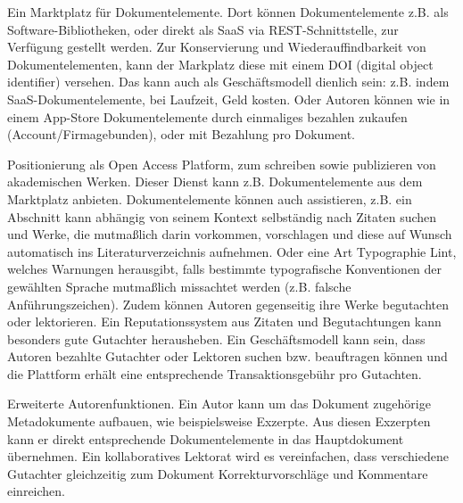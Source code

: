 Ein Marktplatz für Dokumentelemente. Dort können Dokumentelemente z.B. als Software-Bibliotheken, oder direkt als SaaS via REST-Schnittstelle, zur Verfügung gestellt werden. Zur Konservierung und Wiederauffindbarkeit von Dokumentelementen, kann der Markplatz diese mit einem DOI (digital object identifier) versehen. Das kann auch als Geschäftsmodell dienlich sein: z.B. indem SaaS-Dokumentelemente, bei Laufzeit, Geld kosten. Oder Autoren können wie in einem App-Store Dokumentelemente durch einmaliges bezahlen zukaufen (Account/Firmagebunden), oder mit Bezahlung pro Dokument.

 
Positionierung als Open Access Platform, zum schreiben sowie publizieren von akademischen Werken. Dieser Dienst kann z.B. Dokumentelemente aus dem Marktplatz anbieten. Dokumentelemente können auch assistieren, z.B. ein Abschnitt kann abhängig von seinem Kontext selbständig nach Zitaten suchen und Werke, die mutmaßlich darin vorkommen, vorschlagen und diese auf Wunsch automatisch ins Literaturverzeichnis aufnehmen. Oder eine Art Typographie Lint, welches Warnungen herausgibt, falls bestimmte typografische Konventionen der gewählten Sprache mutmaßlich missachtet werden (z.B. falsche Anführungszeichen). Zudem können Autoren gegenseitig ihre Werke begutachten oder lektorieren. Ein Reputationssystem aus Zitaten und Begutachtungen kann besonders gute Gutachter herausheben. Ein Geschäftsmodell kann sein, dass Autoren bezahlte Gutachter oder Lektoren suchen bzw. beauftragen können und die Plattform erhält eine entsprechende Transaktionsgebühr pro Gutachten.

 
Erweiterte Autorenfunktionen. Ein Autor kann um das Dokument zugehörige Metadokumente aufbauen, wie beispielsweise Exzerpte. Aus diesen Exzerpten kann er direkt entsprechende Dokumentelemente in das Hauptdokument übernehmen. Ein kollaboratives Lektorat wird es vereinfachen, dass verschiedene Gutachter gleichzeitig zum Dokument Korrekturvorschläge und Kommentare einreichen.

